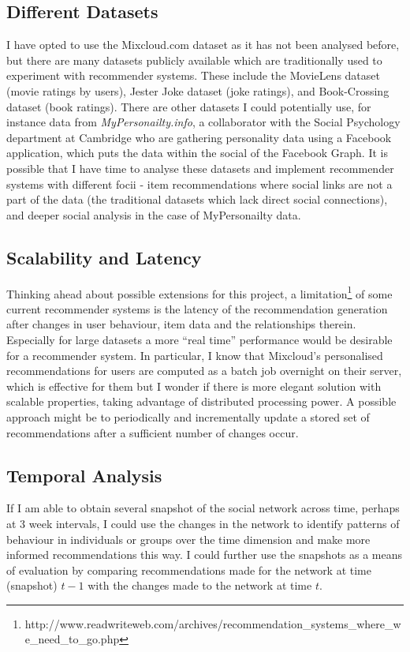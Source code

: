 \subsection*{Different Datasets}

I have opted to use the Mixcloud.com dataset as it has not been analysed before, but there are many datasets publicly available which are traditionally used to experiment with recommender systems. These include the MovieLens dataset (movie ratings by users), Jester Joke dataset (joke ratings), and Book-Crossing dataset (book ratings). There are other datasets I could potentially use, for instance data from \emph{MyPersonailty.info}, a collaborator with the Social Psychology department at Cambridge who are gathering personality data using a Facebook application, which puts the data within the social of the Facebook Graph. It is possible that I have time to analyse these datasets and implement recommender systems with different focii - item recommendations where social links are not a part of the data (the traditional datasets which lack direct social connections), and deeper social analysis in the case of MyPersonailty data.

\subsection*{Scalability and Latency}
Thinking ahead about possible extensions for this project, a limitation\footnote{http://www.readwriteweb.com/archives/recommendation\_systems\_where\_we\_need\_to\_go.php} of some current recommender systems is the latency of the recommendation generation after changes in user behaviour, item data and the relationships therein. Especially for large datasets a more ``real time'' performance would be desirable for a recommender system. In particular, I know that Mixcloud's personalised recommendations for users are computed as a batch job overnight on their server, which is effective for them but I wonder if there is more elegant solution with scalable properties, taking advantage of distributed processing power. A possible approach might be to periodically and incrementally update a stored set of recommendations after a sufficient number of changes occur.

\subsection*{Temporal Analysis}
If I am able to obtain several snapshot of the social network across time, perhaps at 3 week intervals, I could use the changes in the network to identify patterns of behaviour in individuals or groups over the time dimension and make more informed recommendations this way. I could further use the snapshots as a means of evaluation by comparing recommendations made for the network at time (snapshot) $t-1$ with the changes made to the network at time $t$.


